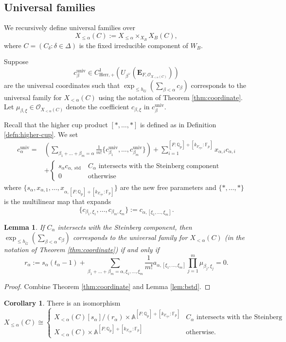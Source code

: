 \documentclass[11pt]{amsart}
\newtheorem{lem}[thm]{Lemma}
\theoremstyle{definition}
\newtheorem{cor}[thm]{Corollary}
\newcommand{\Q}{\mathbb{Q}}
\newcommand{\F}{\mathbb{F}}
\newcommand{\A}{\mathbb{A}}
\newcommand{\bfE}{\mathbf{E}}
\newcommand{\cO}{\mathcal{O}}
\newcommand{\bG}{\breve{G}}
\newcommand{\univ}{{\operatorname{univ}}}
\newcommand{\cyc}{{\operatorname{cyc}}}
\newcommand{\dkF}{[k_{F_{\cyc}}:\F_p]}
\newcommand{\dF}{[F:\Q_p]}
\DeclareMathOperator{\std}{std}
\newcommand{\Herr}{\mathrm{Herr}}
\begin{document}
\subsection{Universal families}
We recursively define universal families
over
\[
X_{\le \alpha}(C):=X_{\le \alpha}\times_{X_B}X_B(C),
\]
where $C=(C_\delta:\delta\in \Delta)$
is the fixed irreducible component
of $W_B$.

Suppose
\[
c_\beta^\univ \in C^1_{\Herr,+}(U_{\beta^\vee}(
\bfE_{F,\cO_{X_{<\alpha}(C)}}))
\]
are the universal coordinates such that
$\exp_{\le h_{\bG}}(\sum_{\beta<\alpha}c_\beta)$
corresponds to the universal family
for $X_{<\alpha}(C)$ using the notation of Theorem \ref{thm:coordinate}.
Let $\mu_{\beta, \xi}\in \cO_{X_{<\alpha}(C)}$
denote the coefficient
$c_{\beta,\xi}$
in $c_\beta^\univ$.

Recall that the higher cup product
$[*,\dots,*]$
is defined as in Definition \ref{defn:higher-cup}.
We set
\begin{align*}
c_{\alpha}^{\univ}
=&(\sum_{\beta_1+\dots+\beta_m=\alpha}\frac{1}{m!}
\{c_{\beta_1}^\univ,\dots, c_{\beta_m}^\univ\})
+
\sum_{i=1}^{\dF+\dkF}
x_{\alpha,i}c_{\alpha,i}
\\
&
+\begin{cases}
s_\alpha
c_{\alpha,\std}
& \text{$C_\alpha$ intersects with the Steinberg component}
\\
0 & \text{otherwise}
\end{cases}
\end{align*}
where
$\{s_\alpha, x_{\alpha,1},\dots,x_{\alpha,\dF+\dkF}\}$
are the new free parameters and
$\{*,\dots,*\}$ is the multilinear map that expands
\[
\{c_{\beta_1,\xi_1},\dots,c_{\beta_m,\xi_m}\}
:=
c_{\alpha, [\xi_1,\dots,\xi_m]}.
\]

\begin{lem}
\rm
\label{lem:eq}
If $C_\alpha$ intersects with the Steinberg component,
then
$\exp_{\le h_{\bG}}(\sum_{\beta<\alpha}c_\beta)$
corresponds to the universal family
for $X_{<\alpha}(C)$ (in the notation of Theorem \ref{thm:coordinate}) if and only if
\[
r_\alpha:=s_\alpha(t_\alpha-1)
+\sum_{\beta_1+\dots+\beta_m=\alpha, \xi_1,\dots,\xi_m}
\frac{1}{m!}
a_{\alpha,[\xi_1,\dots,\xi_m]}
\prod_{j=1}^m\mu_{\beta_j,\xi_j}=0.
\]
\end{lem}

\begin{proof}
Combine Theorem \ref{thm:coordinate}
and Lemma \ref{lem:bstd}.
\end{proof}

\begin{cor}
There is an isomorphism
\[
X_{\le \alpha}(C)
\cong 
\begin{cases}
X_{< \alpha}(C)[s_\alpha]/(r_\alpha) \times \A^{\dF+\dkF}
&
\text{$C_\alpha$ intersects with the Steinberg component}
\\
X_{< \alpha}(C)\times \A^{\dF+\dkF}
&
\text{otherwise}.
\end{cases}
\]
\end{cor}
\end{document}
